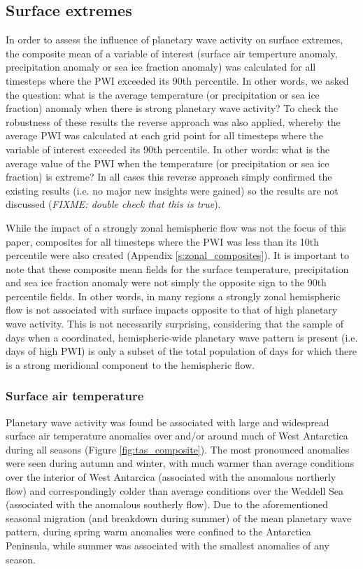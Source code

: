 \subsection{Surface extremes}

In order to assess the influence of planetary wave activity on surface extremes, the composite mean of a variable of interest (surface air temperture anomaly, precipitation anomaly or sea ice fraction anomaly) was calculated for all timesteps where the PWI exceeded its 90th percentile. In other words, we asked the question: what is the average temperature (or precipitation or sea ice fraction) anomaly when there is strong planetary wave activity? To check the robustness of these results the reverse approach was also applied, whereby the average PWI was calculated at each grid point for all timesteps where the variable of interest exceeded its 90th percentile. In other words: what is the average value of the PWI when the temperature (or precipitation or sea ice fraction) is extreme? In all cases this reverse approach simply confirmed the existing results (i.e. no major new insights were gained) so the results are not discussed (\textit{FIXME: double check that this is true}).

While the impact of a strongly zonal hemispheric flow was not the focus of this paper, composites for all timesteps where the PWI was less than its 10th percentile were also created (Appendix \ref{s:zonal_composites}). It is important to note that these composite mean fields for the surface temperature, precipitation and sea ice fraction anomaly were not simply the opposite sign to the 90th percentile fields. In other words, in many regions a strongly zonal hemispheric flow is not associated with surface impacts opposite to that of high planetary wave activity. This is not necessarily surprising, considering that the sample of days when a coordinated, hemispheric-wide planetary wave pattern is present (i.e. days of high PWI) is only a subset of the total population of days for which there is a strong meridional component to the hemispheric flow.

\subsubsection{Surface air temperature}

Planetary wave activity was found be associated with large and widespread surface air temperature anomalies over and/or around much of West Antarctica during all seasons (Figure \ref{fig:tas_composite}). The most pronounced anomalies were seen during autumn and winter, with much warmer than average conditions over the interior of West Antarcica (associated with the anomalous northerly flow) and correspondingly colder than average conditions over the Weddell Sea (associated with the anomalous southerly flow). Due to the aforementioned seasonal migration (and breakdown during summer) of the mean planetary wave pattern, during spring warm anomalies were confined to the Antarctica Peninsula, while summer was associated with the smallest anomalies of any season.  

